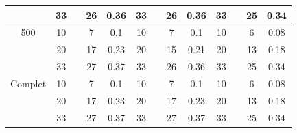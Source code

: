 \documentclass[a4paper,11pt]{article}%
\begin{document}
\begin{table}[h]
\begin{center}
\begin{tabular}{|@{}c@{}|@{}c@{}|@{}c@{}|@{}c@{}|@{}c@{}||@{}c@{}|@{}c@{}|@{}c@{}|@{}c@{}||@{}c@{}|@{}c@{}|@{}c@{}|@{}c@{}|}
  \cline{2-13} 
    & 33& & 26 & 0.36 & 33& & 26 & 0.36 & 33& & 25 & 0.34  \\
  \hline
   500 & 10&  & 7 & 0.1 & 10&  & 7 & 0.1 & 10&  & 6 & 0.08  \\
 \cline{2-13} 
    & 20& & 17 & 0.23 & 20& & 15 & 0.21 & 20& & 13 & 0.18  \\
  \cline{2-13} 
    & 33& & 27 & 0.37 & 33& & 26 & 0.36 & 33& & 25 & 0.34  \\
  \hline
   Complet & 10& & 7 & 0.1 & 10& & 7 & 0.1 & 10& & 6 & 0.08  \\
 \cline{2-13} 
    & 20& & 17 & 0.23 & 20& & 17 & 0.23 & 20& & 13 & 0.18  \\
  \cline{2-13} 
    & 33& & 27 & 0.37 & 33& & 27 & 0.37 & 33& & 25 & 0.34  \\
  \hline
\end{tabular}
\end{center}
\end{table}
\end{document}
